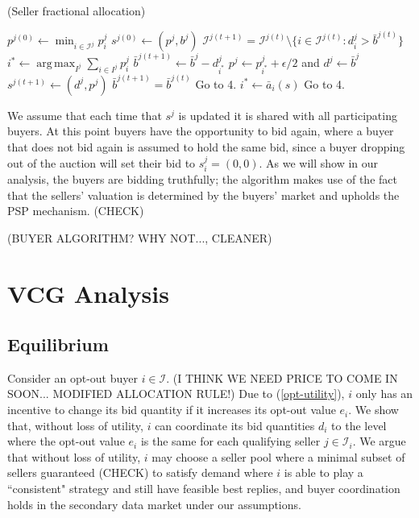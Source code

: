 \documentclass[12pt]{article}
\theoremstyle{definition}
\newcommand{\mcI}{\mathcal{I}}
\DeclareMathOperator*{\argmax}{arg\,max}
\begin{document}
\begin{multicols}{2}
\begin{algorithm}[H]
\caption{(Seller fractional allocation)}
\begin{algorithmic}[1]
\State $p^{j(0)} \gets \min_{i\in\mcI^j} p_i^j$
\State $s^{j(0)} \gets (p^j, b^j)$
\State $\mcI^{j(t+1)} = \mcI^{j(t)}\setminus \lbrace i \in \mcI^{j(t)}: d_i^j >
\bar{b}^{j(t)}\rbrace$
\State $ i^* \gets \displaystyle\argmax_{I^j}\sum_{i\in I^j} p_i^j$ 
\State $\bar{b}^{j(t+1)} \gets \bar{b}^j - d_{i^*}^{j}$
\State $p^j \gets p_{i^*}^j+\epsilon/2$ and $d^j \gets \bar{b}^j$
\State $s^{j(t+1)} \gets (d^j, p^j)$
\State $\bar{b}^{j(t+1)} = \bar{b}^{j(t)}$
\State Go to 4.
\Else
\State $i^* \gets \bar a_i(s)$
\State Go to 4.
\EndIf
\EndWhile
\end{algorithmic}
\end{algorithm}
We assume that each time that $s^j$ is updated it is shared with all
participating buyers. At this point buyers have the opportunity to bid again,
where a buyer that does not bid again is assumed to hold the same bid, since a
buyer dropping out of the auction will set their bid to $s_i^j=(0,0)$. As we will show in our analysis, the buyers are bidding truthfully; the
algorithm makes use of the fact that the sellers' valuation is determined by
the buyers' market and upholds the PSP mechanism. (CHECK)

(BUYER ALGORITHM? WHY NOT..., CLEANER)

\section{VCG Analysis}\label{analysis}
\subsection{Equilibrium}

Consider an opt-out buyer $i\in\mcI$. 
(I THINK WE NEED PRICE TO COME IN SOON... MODIFIED ALLOCATION RULE!)
Due to (\ref{opt-utility}), $i$ only has an incentive to change its bid
quantity if it increases its opt-out value $e_i$. 
We show that, without loss of utility, $i$ can coordinate its
bid quantities $d_i$ to the level where the opt-out value $e_i$ 
 is the same for each qualifying seller $j \in\mcI_i$. We argue
that without loss of utility, $i$ may choose a seller pool where a minimal subset
of sellers guaranteed (CHECK) to satisfy demand where $i$ is able to play a
``consistent" strategy and still have feasible best replies, and buyer
coordination holds in the secondary data market under our assumptions.


\end{multicols}
\end{document}
